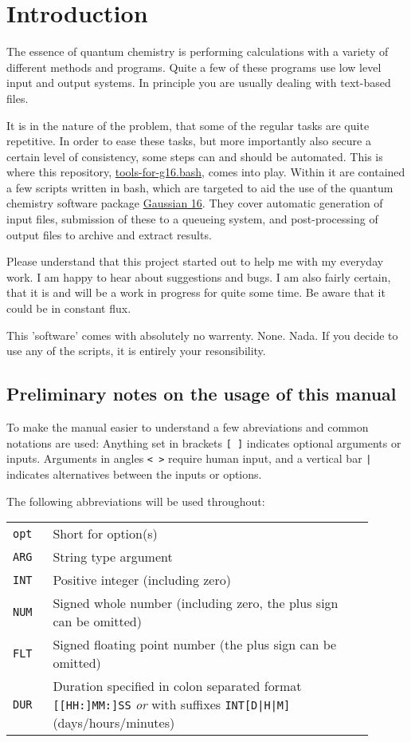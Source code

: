 \documentclass[   %
  final,          %
  a4paper         %
]{article}
\begin{document}
\section{Introduction}
\label{sec:introduction}

The essence of quantum chemistry is performing calculations with a variety of different methods and programs.
Quite a few of these programs use low level input and output systems.
In principle you are usually dealing with text-based files.

It is in the nature of the problem, 
that some of the regular tasks are quite repetitive.
In order to ease these tasks,
but more importantly also secure a certain level of consistency,
some steps can and should be automated.
This is where this repository, 
\href{https://github.com/polyluxus/tools-for-g16.bash}{tools-for-g16.bash},
comes into play.
Within it are contained a few scripts written in bash,
which are targeted to aid the use of the quantum chemistry software package 
\href{http://gaussian.com/}{Gaussian 16}.
They cover automatic generation of input files,
submission of these to a queueing system,
and post-processing of output files to archive and extract results.

Please understand that this project started out to help me with my everyday work. 
I am happy to hear about suggestions and bugs. 
I am also fairly certain, that it is and will be a work in progress for quite some time.
Be aware that it could be in constant flux. 

This 'software' comes with absolutely no warrenty. None. Nada.
If you decide to use any of the scripts, it is entirely your resonsibility.

\subsection{Preliminary notes on the usage of this manual}

To make the manual easier to understand a few abreviations 
and common notations are used:
Anything set in brackets \lstinline{[ ]} indicates optional arguments or inputs.
Arguments in angles \lstinline{< >} require human input, 
and a vertical bar \lstinline{|} indicates alternatives between the inputs or options.

The following abbreviations will be used throughout:

\begin{tabular}{p{0.1\linewidth}p{0.8\linewidth}}
  {\lstinline`opt`} & Short for option(s) \\
  {\lstinline`ARG`} & String type argument \\
  {\lstinline`INT`} & Positive integer (including zero) \\
  {\lstinline`NUM`} & Signed whole number (including zero, the plus sign can be omitted) \\
  {\lstinline`FLT`} & Signed floating point number (the plus sign can be omitted) \\
  {\lstinline`DUR`} & Duration specified in colon separated format {\lstinline`[[HH:]MM:]SS`} %
    \emph{or} with suffixes {\lstinline`INT[D|H|M]`} (days/hours/minutes) \\
\end{tabular}
\end{document}
